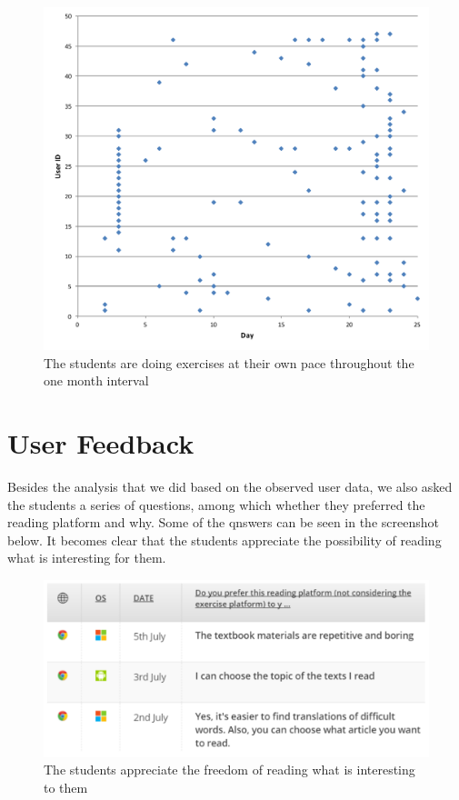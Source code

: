   \begin{figure}[h!]
  \centering
    \includegraphics[width=\columnwidth]{figures/user_exercise_activity_vs_day.pdf}
    \caption{The students are doing exercises at their own pace throughout the one month interval }
  \end{figure}






\section{User Feedback}

Besides the analysis that we did based on the observed user data, we also asked the students a series of questions, among which whether they preferred the reading platform and why. Some of the qnswers can be seen in the screenshot below. It becomes clear that the students appreciate the possibility of reading what is interesting for them.

    \begin{figure}[h!]
    \centering
      \includegraphics[width=0.9\columnwidth]{figures/opinion_on_reading_platform}
      \caption{The students appreciate the freedom of reading what is interesting to them }
    \end{figure}

